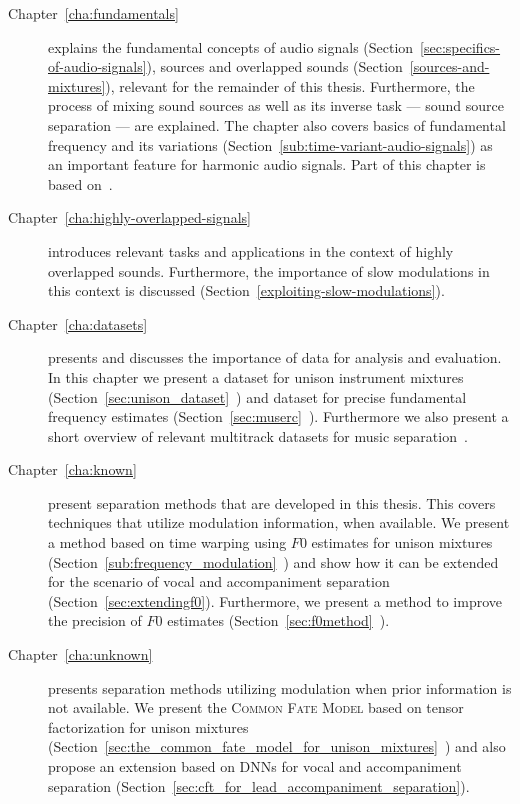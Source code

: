 \begin{description}
  \item[Chapter~\ref{cha:fundamentals}] explains the fundamental concepts of audio signals (Section~\ref{sec:specifics-of-audio-signals}), sources and overlapped sounds (Section~\ref{sources-and-mixtures}), relevant for the remainder of this thesis.
  Furthermore, the process of mixing sound sources as well as its inverse task --- sound source separation --- are explained.
  The chapter also covers basics of fundamental frequency and its variations (Section~\ref{sub:time-variant-audio-signals}) as an important feature for harmonic audio signals.
  Part of this chapter is based on~\cite{rafii18}.
  \item[Chapter~\ref{cha:highly-overlapped-signals}] introduces relevant tasks and applications in the context of highly overlapped sounds.
  Furthermore, the importance of slow modulations in this context is discussed (Section~\ref{exploiting-slow-modulations}).
  \item[Chapter~\ref{cha:datasets}] presents and discusses the importance of data for analysis and evaluation.
  In this chapter we present a dataset for unison instrument mixtures (Section~\ref{sec:unison_dataset}~\cite{oss_unison, stoeter14}) and dataset for precise fundamental frequency estimates (Section~\ref{sec:muserc}~\cite{oss_muserc, stoeter15acm}). Furthermore we also present a short overview of relevant multitrack datasets for music separation~\cite{liutkus17, rafii18}.
  \item[Chapter~\ref{cha:known}] present separation methods that are developed in this thesis. This covers techniques that utilize modulation information, when available. We present a method based on time warping using $F0$ estimates for unison mixtures (Section~\ref{sub:frequency_modulation}~\cite{stoeter14}) and show how it can be extended for the scenario of vocal and accompaniment separation (Section~\ref{sec:extendingf0}). Furthermore, we present a method to improve the precision of $F0$ estimates (Section~\ref{sec:f0method}~\cite{stoeter15icassp}).
  \item[Chapter~\ref{cha:unknown}] presents separation methods utilizing modulation when prior information is not available. We present the \textsc{Common Fate Model} based on tensor factorization for unison mixtures (Section~\ref{sec:the_common_fate_model_for_unison_mixtures}~\cite{stoeter16}) and also propose an extension based on DNNs for vocal and accompaniment separation (Section~\ref{sec:cft_for_lead_accompaniment_separation}).

\end{description}
